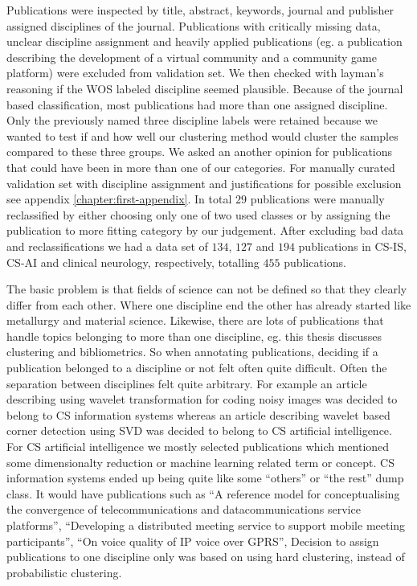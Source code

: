 Publications were inspected by title, abstract, keywords, journal
and publisher assigned disciplines of the journal. Publications
with critically missing data, unclear discipline assignment and
heavily applied publications (eg. a publication describing the 
development of a virtual community and a community game platform)
were excluded from validation set. 
We then checked with layman's reasoning if the WOS labeled 
discipline seemed plausible. Because of the journal based 
classification, most publications had more than one assigned 
discipline. Only the previously named three discipline labels were 
retained because we wanted to test if and how well our clustering 
method would cluster the samples compared to these three 
groups. We asked an another opinion for publications that could 
have been in more than one of our categories. For manually curated
validation set with discipline assignment and justifications for
possible exclusion see appendix \ref{chapter:first-appendix}.
In total $29$ publications were manually reclassified by either
choosing only one of two used classes or by assigning the 
publication to more fitting category by our judgement. After
excluding bad data and reclassifications we had a data set of 
$134$, $127$ and $194$ publications in CS-IS, CS-AI and clinical
neurology, respectively, totalling $455$ publications.

The basic problem is that fields of science can not be 
defined so that they clearly differ from each other. Where one 
discipline end the other has already started like metallurgy and 
material science. Likewise, there are lots of publications that 
handle topics belonging to more than one discipline, eg. this 
thesis discusses clustering and bibliometrics. So when annotating 
publications, deciding if a publication belonged to
a discipline or not felt often quite difficult. Often the 
separation between disciplines felt quite arbitrary. For example
an article describing using wavelet transformation for coding noisy
images was decided to belong to CS information systems whereas an
article describing wavelet based corner detection using SVD was
decided to belong to CS artificial intelligence.
For CS artificial intelligence we mostly selected publications 
which mentioned some dimensionalty reduction or machine learning 
related term or concept. CS information systems ended up being 
quite like some ``others'' or ``the rest'' dump class.
It would have publications such as
``A reference model for conceptualising the convergence of 
telecommunications and datacommunications service platforms'',
``Developing a distributed meeting service to support mobile 
meeting participants'',
``On voice quality of IP voice over GPRS'',
Decision to assign publications to one discipline only was based 
on using hard clustering, instead of probabilistic clustering. 

